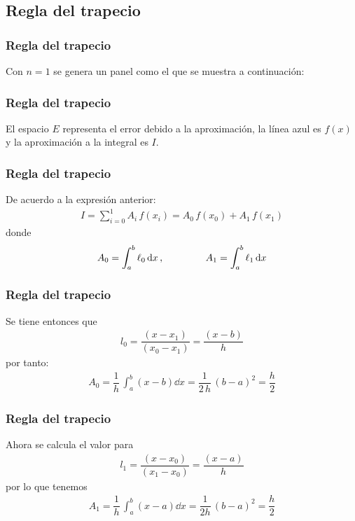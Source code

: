 \subsection{Regla del trapecio}
\begin{frame}
\frametitle{Regla del trapecio}
Con $n = 1$ se genera un panel como el que se muestra a continuación:
\begin{figure}
	\centering
	
\end{figure}
\end{frame}
\begin{frame}
\frametitle{Regla del trapecio}
El espacio $E$ representa el error debido a la aproximación, la línea azul es $f(x)$ y la aproximación a la integral es $I$.
\begin{figure}
    \centering
    
\end{figure}
\end{frame}    
\begin{frame}
\frametitle{Regla del trapecio}
De acuerdo a la expresión anterior:
\begin{align*}
I = \sum_{i=0}^{1} A_{i} \, f(x_{i}) = A_{0} \, f(x_{0}) + A_{1} \, f(x_{1})
\end{align*}
donde
\begin{align*}
A_{0} = \int_{a}^{b} \ell_{0} \dd{x}, \hspace{1.5cm} A_{1} = \int_{a}^{b} \ell_{1} \dd{x}
\end{align*}
\end{frame}
\begin{frame}
\frametitle{Regla del trapecio}
Se tiene entonces que 
\begin{align*}
l_{0} = \dfrac{(x-x_{1})}{(x_{0}-x_{1})} = \dfrac{(x-b)}{h}
\end{align*}
por tanto:
\begin{align*}
A_{0} = \dfrac{1}{h} \, \int_{a}^{b} (x - b) \dd{x} = \dfrac{1}{2 \, h} \, (b - a)^{2}= \dfrac{h}{2}
\end{align*}
\end{frame}
\begin{frame}
\frametitle{Regla del trapecio}
Ahora se calcula el valor para
\begin{align*}
l_{1} = \dfrac{(x - x_{0})}{(x_{1} - x_{0})} = \dfrac{(x-a)}{h}
\end{align*}
por lo que tenemos
\begin{align*}
A_{1} = \dfrac{1}{h} \, \int_{a}^{b} (x - a) \dd{x} = \dfrac{1}{2h} \, (b - a)^{2}= \dfrac{h}{2}
\end{align*}
\end{frame}
